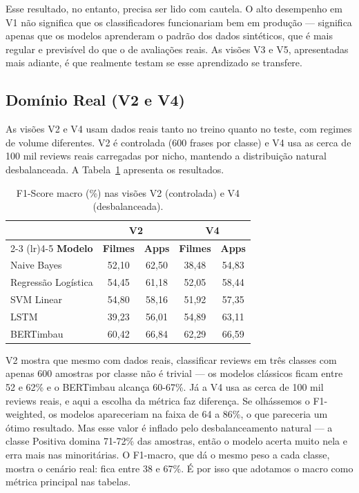 \documentclass[12pt]{article}
\begin{document}
Esse resultado, no entanto, precisa ser lido com cautela. O alto desempenho em V1 não significa que os classificadores funcionariam bem em produção — significa apenas que os modelos aprenderam o padrão dos dados sintéticos, que é mais regular e previsível do que o de avaliações reais. As visões V3 e V5, apresentadas mais adiante, é que realmente testam se esse aprendizado se transfere.

\subsection{Domínio Real (V2 e V4)}

As visões V2 e V4 usam dados reais tanto no treino quanto no teste, com regimes de volume diferentes. V2 é controlada (600 frases por classe) e V4 usa as cerca de 100 mil reviews reais carregadas por nicho, mantendo a distribuição natural desbalanceada. A Tabela~\ref{tab:v2v4} apresenta os resultados.

\begin{table}[h]
\centering
\caption{F1-Score macro (\%) nas visões V2 (controlada) e V4 (desbalanceada).}
\label{tab:v2v4}
\small
\begin{tabular}{lcccc}
\toprule
& \multicolumn{2}{c}{\textbf{V2}} & \multicolumn{2}{c}{\textbf{V4}} \\
\cmidrule(lr){2-3} \cmidrule(lr){4-5}
\textbf{Modelo} & \textbf{Filmes} & \textbf{Apps} & \textbf{Filmes} & \textbf{Apps} \\
\midrule
Naive Bayes         & 52,10 & 62,50 & 38,48 & 54,83 \\
Regressão Logística & 54,45 & 61,18 & 52,05 & 58,44 \\
SVM Linear          & 54,80 & 58,16 & 51,92 & 57,35 \\
LSTM                & 39,23 & 56,01 & 54,89 & 63,11 \\
BERTimbau           & 60,42 & 66,84 & 62,29 & 66,59 \\
\bottomrule
\end{tabular}
\end{table}

V2 mostra que mesmo com dados reais, classificar reviews em três classes com apenas 600 amostras por classe não é trivial — os modelos clássicos ficam entre 52 e 62\% e o BERTimbau alcança 60-67\%. Já a V4 usa as cerca de 100 mil reviews reais, e aqui a escolha da métrica faz diferença. Se olhássemos o F1-weighted, os modelos apareceriam na faixa de 64 a 86\%, o que pareceria um ótimo resultado. Mas esse valor é inflado pelo desbalanceamento natural — a classe Positiva domina 71-72\% das amostras, então o modelo acerta muito nela e erra mais nas minoritárias. O F1-macro, que dá o mesmo peso a cada classe, mostra o cenário real: fica entre 38 e 67\%. É por isso que adotamos o macro como métrica principal nas tabelas.
\end{document}

